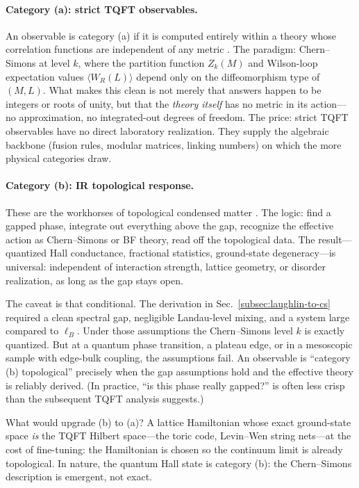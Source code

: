 \paragraph{Category (a): strict TQFT observables.}
An observable is category (a) if it is computed entirely within a theory whose correlation functions are independent of any metric \cite{BirminghamBlauRakowskiThompson1991TopologicalFieldTheory}. The paradigm: Chern--Simons at level $k$, where the partition function $Z_k(M)$ and Wilson-loop expectation values $\langle W_R(L)\rangle$ depend only on the diffeomorphism type of $(M,L)$. What makes this clean is not merely that answers happen to be integers or roots of unity, but that the \emph{theory itself} has no metric in its action---no approximation, no integrated-out degrees of freedom. The price: strict TQFT observables have no direct laboratory realization. They supply the algebraic backbone (fusion rules, modular matrices, linking numbers) on which the more physical categories draw.

\paragraph{Category (b): IR topological response.}
These are the workhorses of topological condensed matter \cite{Wen1995TopologicalOrdersEdgeExcitations,Stern2008AnyonsQHEReview}. The logic: find a gapped phase, integrate out everything above the gap, recognize the effective action as Chern--Simons or BF theory, read off the topological data. The result---quantized Hall conductance, fractional statistics, ground-state degeneracy---is universal: independent of interaction strength, lattice geometry, or disorder realization, as long as the gap stays open.

The caveat is that conditional. The derivation in Sec.~\ref{subsec:laughlin-to-cs} required a clean spectral gap, negligible Landau-level mixing, and a system large compared to $\ell_B$. Under those assumptions the Chern--Simons level $k$ is exactly quantized. But at a quantum phase transition, a plateau edge, or in a mesoscopic sample with edge-bulk coupling, the assumptions fail. An observable is ``category (b) topological'' precisely when the gap assumptions hold and the effective theory is reliably derived. (In practice, ``is this phase really gapped?'' is often less crisp than the subsequent TQFT analysis suggests.)

What would upgrade (b) to (a)? A lattice Hamiltonian whose exact ground-state space \emph{is} the TQFT Hilbert space---the toric code, Levin--Wen string nets---at the cost of fine-tuning: the Hamiltonian is chosen so the continuum limit is already topological. In nature, the quantum Hall state is category (b): the Chern--Simons description is emergent, not exact.

